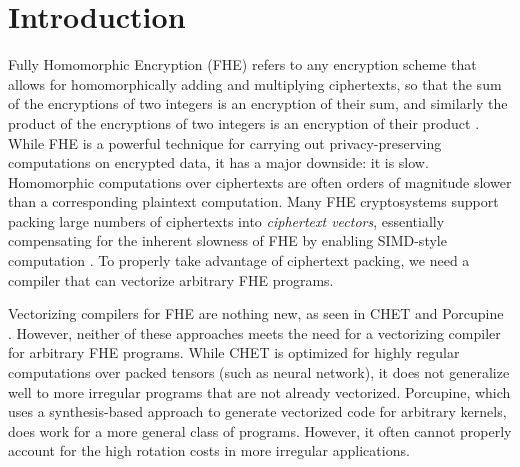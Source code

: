 \section{Introduction}\label{sec:intro}

Fully Homomorphic Encryption (FHE) refers to any encryption scheme that allows for homomorphically adding and multiplying ciphertexts, so that the sum of the encryptions of two integers is an encryption of their sum, and similarly the product of the encryptions of two integers is an encryption of their product \cite{Gentry}.
While FHE is a powerful technique for carrying out privacy-preserving computations on encrypted data, it has a major downside: it is slow.
Homomorphic computations over ciphertexts are often orders of magnitude slower than a corresponding plaintext computation.
Many FHE cryptosystems support packing large numbers of ciphertexts into {\em ciphertext vectors}, essentially compensating for the inherent slowness of FHE by enabling SIMD-style computation \cite{BrakerskiPacking,SmartPacking}.
To properly take advantage of ciphertext packing, we need a compiler that can vectorize arbitrary FHE programs.

Vectorizing compilers for FHE are nothing new, as seen in CHET and Porcupine \cite{CHET, Porcupine}.
However, neither of these approaches meets the need for a vectorizing compiler for arbitrary FHE programs.
While CHET is optimized for highly regular computations over packed tensors (such as neural network), it does not generalize well to more irregular programs that are not already vectorized. 
Porcupine, which uses a synthesis-based approach to generate vectorized code for arbitrary kernels, does work for a more general class of programs.
However, it often cannot properly account for the high rotation costs in more irregular applications. 

